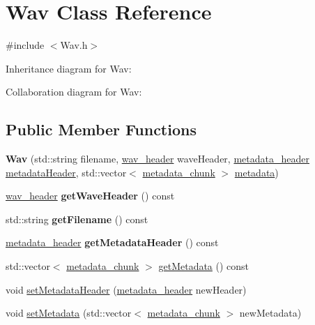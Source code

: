 \hypertarget{classWav}{}\section{Wav Class Reference}
\label{classWav}


{\ttfamily \#include $<$Wav.\+h$>$}



Inheritance diagram for Wav\+:


Collaboration diagram for Wav\+:
\subsection*{Public Member Functions}
\begin{DoxyCompactItemize}
\item 
\mbox{\label{classWav_a1a3e774ef3b1f3b55b3cc3404735957b}} 
{\bfseries Wav} (std\+::string filename, \hyperlink{structwav__header}{wav\+\_\+header} wave\+Header, \hyperlink{structmetadata__header}{metadata\+\_\+header} \hyperlink{classWav_a4ddb72dc81101f50ef1f6c4d0e8dc257}{metadata\+Header}, std\+::vector$<$ \hyperlink{structmetadata__chunk}{metadata\+\_\+chunk} $>$ \hyperlink{classWav_a69b39a8dd2ddd962b6acb966e0f454ee}{metadata})
\item 
\mbox{\label{classWav_addc6dbce8755fd6fecc5ea1f5033cde4}} 
\hyperlink{structwav__header}{wav\+\_\+header} {\bfseries get\+Wave\+Header} () const
\item 
\mbox{\label{classWav_a7382a5afd932fba8310063b37e086f38}} 
std\+::string {\bfseries get\+Filename} () const
\item 
\mbox{\label{classWav_acc6b7db86641ce99cf953c6f898ba348}} 
\hyperlink{structmetadata__header}{metadata\+\_\+header} {\bfseries get\+Metadata\+Header} () const
\item 
std\+::vector$<$ \hyperlink{structmetadata__chunk}{metadata\+\_\+chunk} $>$ \hyperlink{classWav_ac89cb1f2f327fab3a32d3ba3cd1261f8}{get\+Metadata} () const
\item 
void \hyperlink{classWav_a22586ef9396d094658ffc51e0d2108d5}{set\+Metadata\+Header} (\hyperlink{structmetadata__header}{metadata\+\_\+header} new\+Header)
\item 
void \hyperlink{classWav_a597dc2c221a3cdb5da499b91f6e907a6}{set\+Metadata} (std\+::vector$<$ \hyperlink{structmetadata__chunk}{metadata\+\_\+chunk} $>$ new\+Metadata)
\end{DoxyCompactItemize}
